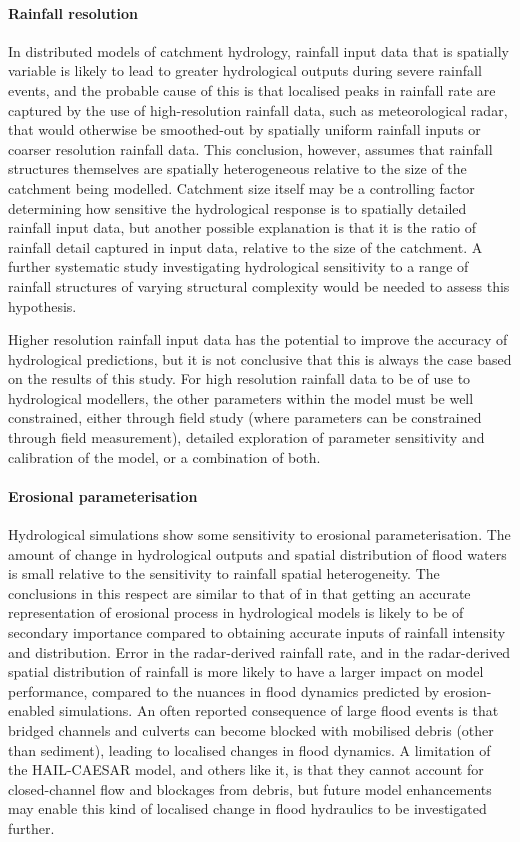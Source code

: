 \paragraph{Rainfall resolution}
In distributed models of catchment hydrology, rainfall input data that is spatially variable is likely to lead to greater hydrological outputs during severe rainfall events, and the probable cause of this is that localised peaks in rainfall rate are captured by the use of high-resolution rainfall data, such as meteorological radar, that would otherwise be smoothed-out by spatially uniform rainfall inputs or coarser resolution rainfall data. This conclusion, however, assumes that rainfall structures themselves are spatially heterogeneous relative to the size of the catchment being modelled. Catchment size itself may be a controlling factor determining how sensitive the hydrological response is to spatially detailed rainfall input data, but another possible explanation is that it is the ratio of rainfall detail captured in input data, relative to the size of the catchment. A further systematic study investigating hydrological sensitivity to a range of rainfall structures of varying structural complexity would be needed to assess this hypothesis. 

Higher resolution rainfall input data has the potential to improve the accuracy of hydrological predictions, but it is not conclusive that this is always the case based on the results of this study. For high resolution rainfall data to be of use to hydrological modellers, the other parameters within the model must be well constrained, either through field study (where parameters can be constrained through field measurement), detailed exploration of parameter sensitivity and calibration of the model, or a combination of both. 

\paragraph{Erosional parameterisation}
Hydrological simulations show some sensitivity to erosional parameterisation. The amount of change in hydrological outputs and spatial distribution of flood waters is small relative to the sensitivity to rainfall spatial heterogeneity. The conclusions in this respect are similar to that of \citet{wong2015sensitivity} in that getting an accurate representation of erosional process in hydrological models is likely to be of secondary importance compared to obtaining accurate inputs of rainfall intensity and distribution. Error in the radar-derived rainfall rate, and in the radar-derived spatial distribution of rainfall is more likely to have a larger impact on model performance, compared to the nuances in flood dynamics predicted by erosion-enabled simulations. An often reported consequence of large flood events is that bridged channels and culverts can become blocked  with mobilised debris (other than sediment), leading to localised changes in flood dynamics. A limitation of the HAIL-CAESAR model, and others like it, is that they cannot account for closed-channel flow and blockages from debris, but future model enhancements may enable this kind of localised change in flood hydraulics to be investigated further.

